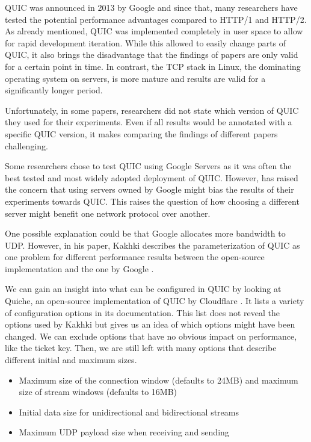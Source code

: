 \documentclass[conference]{IEEEtran}
\begin{document}

QUIC was announced in 2013 by Google and since that, many researchers have tested the potential performance advantages compared to HTTP/1 and HTTP/2. As already mentioned, QUIC was implemented completely in user space to allow for rapid development iteration. While this allowed to easily change parts of QUIC, it also brings the disadvantage that the findings of papers are only valid for a certain point in time. In contrast, the TCP stack in Linux, the dominating operating system on servers, is more mature and results are valid for a significantly longer period. 

Unfortunately, in some papers, researchers did not state which version of QUIC they used for their experiments. Even if all results would be annotated with a specific QUIC version, it makes comparing the findings of different papers challenging.

Some researchers chose to test QUIC using Google Servers as it was often the best tested and most widely adopted deployment of QUIC. However, \cite{Nepomuceno} has raised the concern that using servers owned by Google might bias the results of their experiments towards QUIC. This raises the question of how choosing a different server might benefit one network protocol over another.

One possible explanation could be that Google allocates more bandwidth to UDP. However, in his paper, Kakhki describes the parameterization of QUIC as one problem for different performance results between the open-source implementation and the one by Google \cite{Kakhki}. 

We can gain an insight into what can be configured in QUIC by looking at Quiche, an open-source implementation of QUIC by Cloudflare \cite{Quiche}. It lists a variety of configuration options in its documentation. This list does not reveal the options used by Kakhki but gives us an idea of which options might have been changed. We can exclude options that have no obvious impact on performance, like the ticket key. Then, we are still left with many options that describe different initial and maximum sizes.

\begin{itemize}
  \item Maximum size of the connection window (defaults to 24MB) and maximum size of stream windows (defaults to 16MB)
  \item Initial data size for unidirectional and bidirectional streams
  \item Maximum UDP payload size when receiving and sending
\end{itemize}
\end{document}
